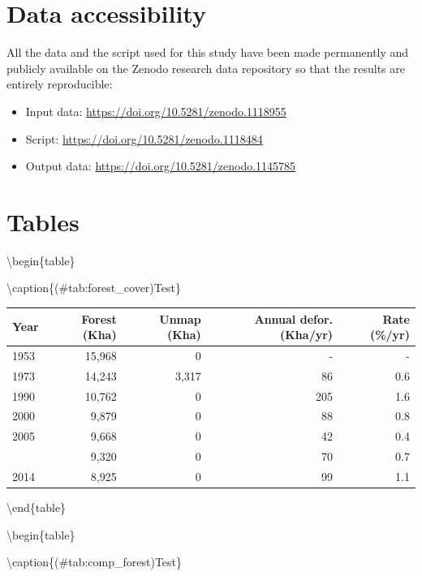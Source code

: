 \documentclass[]{article}
\providecommand{\tightlist}{%
  \setlength{\itemsep}{0pt}\setlength{\parskip}{0pt}}
\theoremstyle{definition}
\theoremstyle{definition}
\theoremstyle{definition}
\theoremstyle{remark}
\begin{document}
\hypertarget{data-accessibility}{%
\section{Data accessibility}\label{data-accessibility}}

All the data and the script used for this study have been made
permanently and publicly available on the Zenodo research data
repository so that the results are entirely reproducible:

\begin{itemize}
\tightlist
\item
  Input data: \url{https://doi.org/10.5281/zenodo.1118955}
\item
  Script: \url{https://doi.org/10.5281/zenodo.1118484}
\item
  Output data: \url{https://doi.org/10.5281/zenodo.1145785}
\end{itemize}

\hypertarget{tables}{%
\section{Tables}\label{tables}}

\textbackslash{}begin\{table\}

\textbackslash{}caption\{(\#tab:forest\_cover)Test\} \centering

\begin{tabular}[t]{lrrrr}
\toprule
Year & Forest (Kha) & Unmap (Kha) & Annual defor. (Kha/yr) & Rate (\%/yr)\\
\midrule
1953 & 15,968 & 0 & - & -\\
1973 & 14,243 & 3,317 & 86 & 0.6\\
1990 & 10,762 & 0 & 205 & 1.6\\
2000 & 9,879 & 0 & 88 & 0.8\\
2005 & 9,668 & 0 & 42 & 0.4\\
\addlinespace
2010 & 9,320 & 0 & 70 & 0.7\\
2014 & 8,925 & 0 & 99 & 1.1\\
\bottomrule
\end{tabular}

\textbackslash{}end\{table\}

\textbackslash{}begin\{table\}

\textbackslash{}caption\{(\#tab:comp\_forest)Test\} \centering
\end{document}
